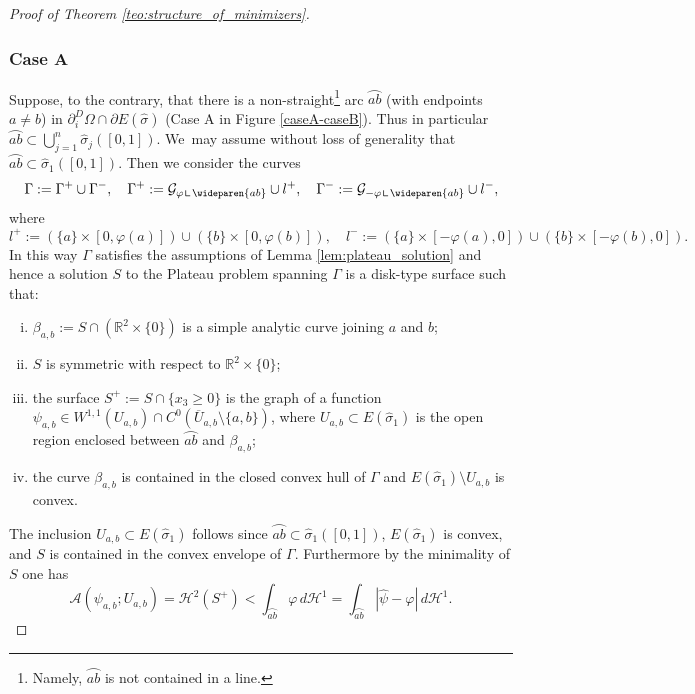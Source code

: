 \documentclass[JEP,XML,SOM,Unicode, NoFloatCountersInSection,published]{cedram}
\newcommand{\R}{\mathbb{R}}
\let\arc\wideparen
\let\Om\Omega
\newcommand{\resa}{\mathop{\hbox{\vrule height 7pt width 0.5pt depth 0pt
\vrule height 0.5pt width 6pt depth 0pt}}\nolimits}
\newcommand{\resb}{\mathop{\hbox{\vrule height 4pt width 0.5pt depth 0pt
\vrule height 0.5pt width 3pt depth 0pt}}\nolimits}
\newcommand{\res}{\mathchoice{\resa}{\resa}{\resb}{\resb}}
\theoremstyle{definition}
\begin{document}
\begin{proof}[Proof of Theorem \ref{teo:structure_of_minimizers}]
\subsubsection*{Case A}
Suppose, to the contrary,
that there is a non-straight\footnote{Namely, $\arc{ab}$ is not contained in a line.} arc $\arc{ab}$ (with endpoints $a\ne b$) in $\partial_i^D\Om\cap\partial E(\widehat\sigma)$ (Case A in Figure \ref{caseA-caseB}). Thus in particular $\arc{ab}\subset\bigcup_{j=1}^n\widehat\sigma_j([0,1])$. We~may assume without loss of generality that $\arc{ab}\subset\widehat\sigma_1([0,1])$.
Then we consider the curves
\begin{equation}\label{def:curve}
\Gamma:=\Gamma^+\cup\Gamma^-,\quad
\Gamma^+:=\mathcal{G}_{\varphi\res\arc{ab}}\cup l^+,\quad \Gamma^-:=\mathcal{G}_{-\varphi\res\arc{ab}}\cup l^-,
\end{equation}
where
\begin{equation*}
l^+:=(\{a\}\times[0,\varphi(a)])\cup (\{b\}\times[0,\varphi(b)]),\quad
l^-:=(\{a\}\times[-\varphi(a),0])\cup (\{b\}\times[-\varphi(b),0]).
\end{equation*}
In this way $\Gamma$ satisfies the assumptions of Lemma \ref{lem:plateau_solution} and hence a solution $S$ to the Plateau problem spanning $\Gamma$ is a disk-type surface such that:
\begin{enumerate}[(i),wide]
\item\label{i} $\beta_{a,b}:=S\cap (\R^2\times\{0\})$
is a simple analytic curve joining $a$ and $b$;
\item\label{ii}$S$ is symmetric with respect to $\R^2\times\{0\}$;
\item \label{iii} the surface $S^+:=S\cap\{x_3\ge0\}$
is the graph of a function $\psi_{a,b}\in W^{1,1}( U_{a,b})\cap C^0(\overline U_{a,b}\setminus\{a,b\})$, where $U_{a,b}\subset E(\widehat\sigma_1)$ is the open region enclosed between $\arc{ab}$ and $\beta_{a,b}$;
\item\label{iv} the curve $\beta_{a,b}$ is contained in the closed
convex hull of $\Gamma$ and $E(\widehat\sigma_1)\setminus U_{a,b}$ is convex.
\end{enumerate}
The inclusion $U_{a,b}\subset E(\widehat\sigma_1)$ follows since $\arc{ab}\subset\widehat\sigma_1([0,1])$, $E(\widehat\sigma_1)$ is convex, and $S$ is contained in the convex envelope of $\Gamma$.
Furthermore by the minimality of $S$ one has
\begin{equation}\label{eq:contradiction}
\mathcal{A}(\psi_{a,b};U_{a,b})=\mathcal{H}^2(S^+)< \int_{\arc{ab}}\varphi\,d\mathcal{H}^1= \int_{\arc{ab}}|\widehat\psi-\varphi|\,d\mathcal{H}^1.

\end{equation}
\end{proof}
\end{document}
